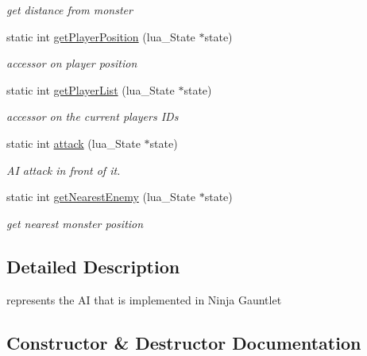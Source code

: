 \begin{DoxyCompactItemize}
\begin{DoxyCompactList}\small\item\em get distance from monster \end{DoxyCompactList}\item 
\mbox{\label{classIA_a6044bd4c6e63449603d37b8ba3484b01}} 
static int \hyperlink{classIA_a6044bd4c6e63449603d37b8ba3484b01}{get\+Player\+Position} (lua\+\_\+\+State $\ast$state)
\begin{DoxyCompactList}\small\item\em accessor on player position \end{DoxyCompactList}\item 
\mbox{\label{classIA_a091c6a4f9655a77588c803e5f73c0ff6}} 
static int \hyperlink{classIA_a091c6a4f9655a77588c803e5f73c0ff6}{get\+Player\+List} (lua\+\_\+\+State $\ast$state)
\begin{DoxyCompactList}\small\item\em accessor on the current players I\+Ds \end{DoxyCompactList}\item 
\mbox{\label{classIA_a3c0cefad0fafba85e286b3dcc6866a18}} 
static int \hyperlink{classIA_a3c0cefad0fafba85e286b3dcc6866a18}{attack} (lua\+\_\+\+State $\ast$state)
\begin{DoxyCompactList}\small\item\em AI attack in front of it. \end{DoxyCompactList}\item 
\mbox{\label{classIA_a80d41191c72e03f55a7547893aff9c68}} 
static int \hyperlink{classIA_a80d41191c72e03f55a7547893aff9c68}{get\+Nearest\+Enemy} (lua\+\_\+\+State $\ast$state)
\begin{DoxyCompactList}\small\item\em get nearest monster position \end{DoxyCompactList}\end{DoxyCompactItemize}


\subsection{Detailed Description}
represents the AI that is implemented in Ninja Gauntlet 

\subsection{Constructor \& Destructor Documentation}
\mbox{\label{classIA_a0733aa0c9dd00b142f8b474fc3b0b714}} 
